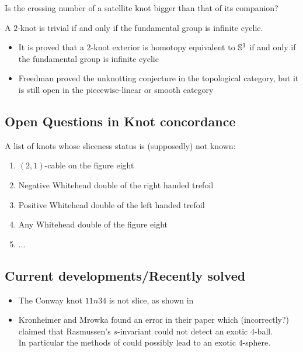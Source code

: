 \begin{openquestion}
	Is the crossing number of a satellite knot bigger than that of its companion?
\end{openquestion}

\begin{openquestion}
	A $2$-knot is trivial if and only if the fundamental group
	is infinite cyclic.
\end{openquestion}

\begin{remark}
	\begin{itemize}
		\item It is proved that a $2$-knot exterior
		is homotopy equivalent to $\mathbb{S}^{1}$ if and only if
		the fundamental group is infinite cyclic
		
		\item Freedman proved the unknotting conjecture in the
		topological category,
		but it is still open in the piecewise-linear or smooth
		category
	\end{itemize}
\end{remark}



\subsection{Open Questions in Knot concordance}

A list of knots whose sliceness status is (supposedly) not known:
\begin{enumerate}
	\item $(2, 1)$-cable on the figure eight
	\item Negative Whitehead double of the right handed trefoil
	\item Positive Whitehead double of the left handed trefoil
	\item Any Whitehead double of the figure eight
	\item ...
\end{enumerate}


\subsection{Current developments/Recently solved}

\begin{itemize}
	\item The Conway knot $11n34$ is not slice, as shown
	in \citep{piccirillo2018conway}
	
	\item Kronheimer and Mrowka found an error
	in their paper \citep{kronheimer2013gauge} which
	(incorrectly?) claimed that Rasmussen's $s$-invariant could
	not detect an exotic $4$-ball. \\
	In particular the methods of
	\citep{freedman2009man} could possibly lead
	to an
	exotic $4$-sphere.
	
\end{itemize}
